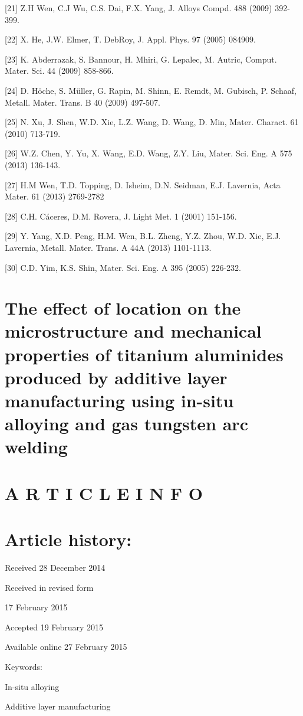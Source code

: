 \documentclass[10pt]{article}
\begin{document}
[21] Z.H Wen, C.J Wu, C.S. Dai, F.X. Yang, J. Alloys Compd. 488 (2009) 392-399.

[22] X. He, J.W. Elmer, T. DebRoy, J. Appl. Phys. 97 (2005) 084909.

[23] K. Abderrazak, S. Bannour, H. Mhiri, G. Lepalec, M. Autric, Comput. Mater. Sci. 44 (2009) 858-866.

[24] D. Höche, S. Müller, G. Rapin, M. Shinn, E. Remdt, M. Gubisch, P. Schaaf, Metall. Mater. Trans. B 40 (2009) 497-507.

[25] N. Xu, J. Shen, W.D. Xie, L.Z. Wang, D. Wang, D. Min, Mater. Charact. 61 (2010) 713-719.

[26] W.Z. Chen, Y. Yu, X. Wang, E.D. Wang, Z.Y. Liu, Mater. Sci. Eng. A 575 (2013) 136-143.

[27] H.M Wen, T.D. Topping, D. Isheim, D.N. Seidman, E.J. Lavernia, Acta Mater. 61 (2013) 2769-2782

[28] C.H. Cáceres, D.M. Rovera, J. Light Met. 1 (2001) 151-156.

[29] Y. Yang, X.D. Peng, H.M. Wen, B.L. Zheng, Y.Z. Zhou, W.D. Xie, E.J. Lavernia, Metall. Mater. Trans. A 44A (2013) 1101-1113.

[30] C.D. Yim, K.S. Shin, Mater. Sci. Eng. A 395 (2005) 226-232.

\section*{The effect of location on the microstructure and mechanical properties of titanium aluminides produced by additive layer manufacturing using in-situ alloying and gas tungsten arc welding }


\section*{A R T I C L E I N F O}
\section*{Article history:}
Received 28 December 2014

Received in revised form

17 February 2015

Accepted 19 February 2015

Available online 27 February 2015

Keywords:

In-situ alloying

Additive layer manufacturing
\end{document}
